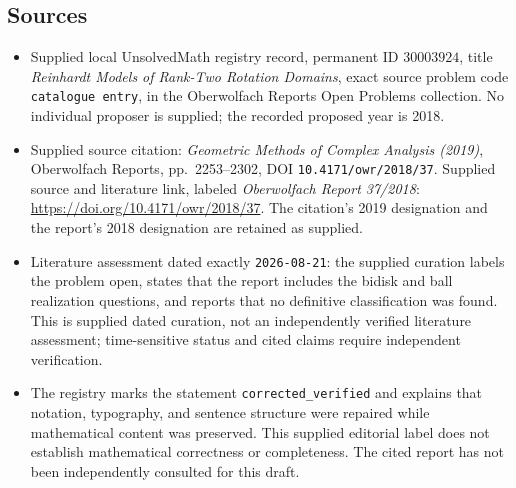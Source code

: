 \documentclass[11pt]{article}
\begin{document}
\subsection{Sources}
\begin{itemize}
\item Supplied local UnsolvedMath registry record, permanent ID \(30003924\), title \emph{Reinhardt Models of Rank-Two Rotation Domains}, exact source problem code \texttt{catalogue entry}, in the Oberwolfach Reports Open Problems collection. No individual proposer is supplied; the recorded proposed year is 2018.
\item Supplied source citation: \emph{Geometric Methods of Complex Analysis (2019)}, Oberwolfach Reports, pp.\ 2253--2302, DOI \texttt{10.4171/owr/2018/37}. Supplied source and literature link, labeled \emph{Oberwolfach Report 37/2018}: \url{https://doi.org/10.4171/owr/2018/37}. The citation's 2019 designation and the report's 2018 designation are retained as supplied.
\item Literature assessment dated exactly \texttt{2026-08-21}: the supplied curation labels the problem open, states that the report includes the bidisk and ball realization questions, and reports that no definitive classification was found. This is supplied dated curation, not an independently verified literature assessment; time-sensitive status and cited claims require independent verification.
\item The registry marks the statement \texttt{corrected\_verified} and explains that notation, typography, and sentence structure were repaired while mathematical content was preserved. This supplied editorial label does not establish mathematical correctness or completeness. The cited report has not been independently consulted for this draft.
\end{itemize}
\end{document}
